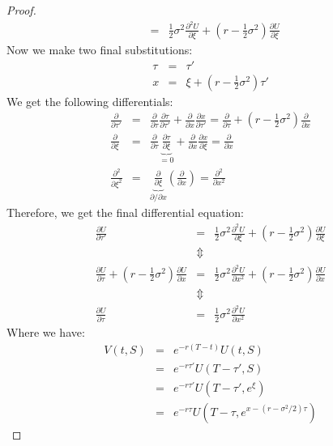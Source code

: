 \documentclass[11pt]{article}
\theoremstyle{definition}
\newcommand{\brac}[1]{\left(#1\right)}
\newcommand{\pardiff}[2]{\frac{\partial #1}{\partial #2}}
\begin{document}
\begin{proof}
\begin{eqnarray*}
			&=&\frac{1}{2}\sigma^2 \pardiff{^2U}{\xi} + \brac{r-\frac{1}{2}\sigma^2}\pardiff{U}{\xi}
		\end{eqnarray*}
		Now we make two final substitutions:
		\begin{eqnarray*}
			\tau &=& \tau'\\
			x &=& \xi + \brac{r-\frac{1}{2}\sigma^2}\tau'
		\end{eqnarray*}
		We get the following differentials:
		\begin{eqnarray*}
			\pardiff{}{\tau'} &=& \pardiff{}{\tau}\pardiff{\tau}{\tau'} + \pardiff{}{x}\pardiff{x}{\tau'} = \pardiff{}{\tau} + \brac{r - \frac{1}{2}\sigma^2}\pardiff{}{x}\\
			\pardiff{}{\xi} &=& \pardiff{}{\tau}\underbrace{\pardiff{\tau}{\xi}}_{=0} + \pardiff{}{x}\pardiff{x}{\xi}  = \pardiff{}{x}\\
			\pardiff{^2}{\xi^2} &=& \underbrace{\pardiff{}{\xi}}_{\partial /\partial x}\brac{\pardiff{}{x}} = \pardiff{^2}{x^2}
		\end{eqnarray*}
		Therefore, we get the final differential equation:
		\begin{eqnarray*}
			\pardiff{U}{\tau'} &=& \frac{1}{2}\sigma^2 \pardiff{^2U}{\xi} + \brac{r-\frac{1}{2}\sigma^2}\pardiff{U}{\xi}\\
			&\Updownarrow&\\
			\pardiff{U}{\tau} + \brac{r - \frac{1}{2}\sigma^2}\pardiff{U}{x} &=& \frac{1}{2}\sigma^2\pardiff{^2U}{x^2} +  \brac{r - \frac{1}{2}\sigma^2}\pardiff{U}{x}\\
			&\Updownarrow&\\
			\pardiff{U}{\tau} &=& \frac{1}{2}\sigma^2\pardiff{^2U}{x^2}
		\end{eqnarray*}
		Where we have:
		\begin{eqnarray*}
			V(t,S) &=& e^{-r\brac{T-t}}U(t,S)\\
			&=& e^{-r\tau'}U\brac{T-\tau',S}\\
			&=& e^{-r\tau'}U\brac{T-\tau',e^{\xi}}\\
			&=& e^{-r\tau}U\brac{T-\tau,e^{x-\brac{r-\sigma^2/2}\tau}}
		\end{eqnarray*}
	\end{proof}
	
\end{document}
